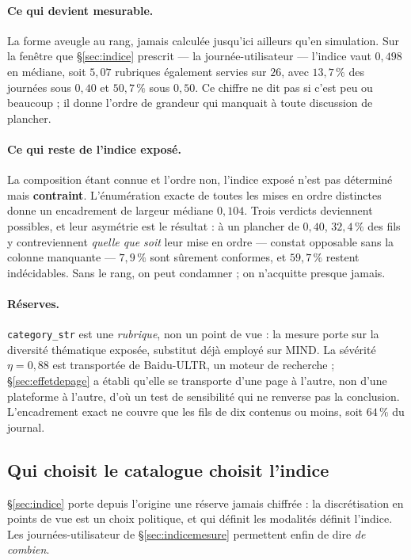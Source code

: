 \documentclass[11pt,a4paper]{article}
\begin{document}
\paragraph{Ce qui devient mesurable.} La forme aveugle au rang, jamais calculée jusqu'ici
ailleurs qu'en simulation. Sur la fenêtre que \S\ref{sec:indice} prescrit --- la
journée-utilisateur --- l'indice vaut $0{,}498$ en médiane, soit $5{,}07$ rubriques également
servies sur $26$, avec $13{,}7\,\%$ des journées sous $0{,}40$ et $50{,}7\,\%$ sous $0{,}50$. Ce
chiffre ne dit pas si c'est peu ou beaucoup ; il donne l'ordre de grandeur qui manquait à toute
discussion de plancher.

\paragraph{Ce qui reste de l'indice exposé.} La composition étant connue et l'ordre non,
l'indice exposé n'est pas déterminé mais \textbf{contraint}. L'énumération exacte de toutes les
mises en ordre distinctes donne un encadrement de largeur médiane $0{,}104$. Trois verdicts
deviennent possibles, et leur asymétrie est le résultat : à un plancher de $0{,}40$, $32{,}4\,\%$
des fils y contreviennent \emph{quelle que soit} leur mise en ordre --- constat opposable sans la
colonne manquante --- $7{,}9\,\%$ sont sûrement conformes, et $59{,}7\,\%$ restent indécidables.
Sans le rang, on peut condamner ; on n'acquitte presque jamais.

\paragraph{Réserves.} \texttt{category\_str} est une \emph{rubrique}, non un point de vue : la
mesure porte sur la diversité thématique exposée, substitut déjà employé sur MIND. La sévérité
$\eta = 0{,}88$ est transportée de Baidu-ULTR, un moteur de recherche ; \S\ref{sec:effetdepage}
a établi qu'elle se transporte d'une page à l'autre, non d'une plateforme à l'autre, d'où un test
de sensibilité qui ne renverse pas la conclusion. L'encadrement exact ne couvre que les fils de
dix contenus ou moins, soit $64\,\%$ du journal.

\subsection{Qui choisit le catalogue choisit l'indice}
\label{sec:catalogue}

\S\ref{sec:indice} porte depuis l'origine une réserve jamais chiffrée : la discrétisation en
points de vue est un choix politique, et qui définit les modalités définit l'indice. Les
journées-utilisateur de \S\ref{sec:indicemesure} permettent enfin de dire \emph{de combien}.
\end{document}
